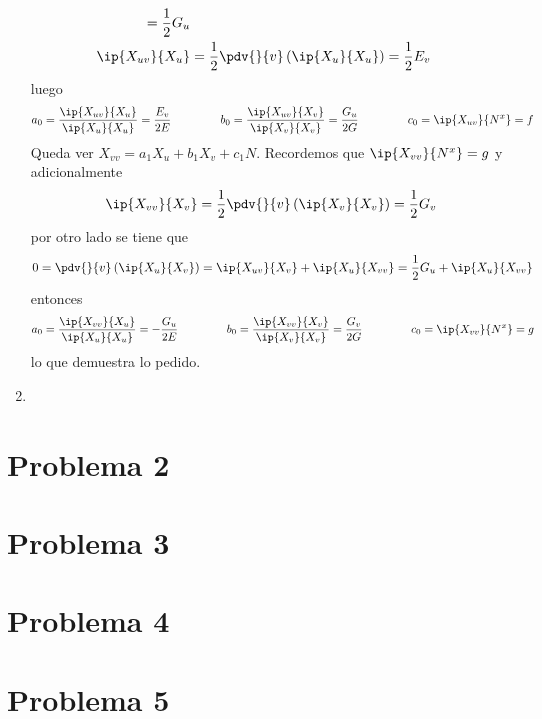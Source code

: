 \documentclass{article}
\begin{document}
\begin{enumerate}
\begin{align*}
        =\frac{1}{2}G_{u} \\
        \ip{X_{uv}}{X_{u}} &= \frac{1}{2}\pdv{}{v}\left(\ip{X_{u}}{X_{u}}\right)
        =\frac{1}{2}E_{v}
    \end{align*}
    luego
    \begin{equation*}
        a_{0}=\frac{\ip{X_{uv}}{X_{u}}}{\ip{X_{u}}{X_{u}}}=\frac{E_{v}}{2E}\hspace{1.5cm}
        b_{0}=\frac{\ip{X_{uv}}{X_{v}}}{\ip{X_{v}}{X_{v}}}=\frac{G_{u}}{2G}\hspace{1.5cm}
        c_{0}=\ip{X_{uv}}{N^{x}}=f
    \end{equation*}
    Queda ver $ X_{vv}=a_{1}X_{u}+b_{1}X_{v}+c_{1}N$. Recordemos que $\ip{X_{vv}}{N^{x}}=g$ y
    adicionalmente
    \begin{equation*}
        \ip{X_{vv}}{X_{v}}=\frac{1}{2}\pdv{}{v}\left(\ip{X_{v}}{X_{v}}\right)=\frac{1}{2}G_{v}
    \end{equation*}
    por otro lado se tiene que
    \begin{equation*}
        0=\pdv{}{v}\left(\ip{X_{u}}{X_{v}}\right)=\ip{X_{uv}}{X_{v}}+\ip{X_{u}}{X_{vv}}
        =\frac{1}{2}G_{u}+\ip{X_{u}}{X_{vv}}
    \end{equation*}
    entonces
    \begin{equation*}
        a_{0}=\frac{\ip{X_{vv}}{X_{u}}}{\ip{X_{u}}{X_{u}}}=-\frac{G_{u}}{2E}\hspace{1.5cm}
        b_{0}=\frac{\ip{X_{vv}}{X_{v}}}{\ip{X_{v}}{X_{v}}}=\frac{G_{v}}{2G}\hspace{1.5cm}
        c_{0}=\ip{X_{vv}}{N^{x}}=g
    \end{equation*}
    lo que demuestra lo pedido.

    \item
\end{enumerate}

\section*{Problema 2}

\section*{Problema 3}

\section*{Problema 4}

\section*{Problema 5}


\end{document}
